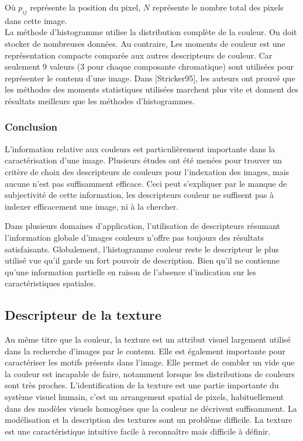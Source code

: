 Où $p_{ij}$ représente la position du pixel, $N$ représente le nombre total des pixels dans cette image.\\


La méthode d'histogramme utilise la distribution complète de la couleur. On doit stocker de nombreuses données. Au contraire, Les moments de couleur est une représentation compacte comparée aux autres descripteurs de couleur. Car seulement 9 valeurs (3 pour chaque composante chromatique) sont utilisées pour représenter le contenu d'une image. Dans [Stricker95], les auteurs ont prouvé que les méthodes des moments statistiques utilisées marchent plus vite et donnent des résultats meilleurs que les méthodes d’histogrammes.\\



\subsubsection{Conclusion}
L'information relative aux couleurs est particulièrement importante dans la caractérisation d’une image. Plusieurs études ont été menées pour trouver un critère de choix des descripteurs de couleurs pour l'indexation des images, mais aucune n'est pas suffisamment efficace. Ceci peut s’expliquer par le manque de subjectivité de cette information, les descripteurs couleur ne suffisent pas à indexer efficacement une image, ni à la chercher.

Dans plusieurs domaines d’application, l’utilisation de descripteurs résumant l’information globale d’images couleurs n’offre pas toujours des résultats satisfaisants. Globalement, l’histogramme couleur reste le descripteur le plus utilisé vue qu'il garde un fort pouvoir de description. Bien qu’il ne contienne qu’une information partielle en raison de l’absence d’indication sur les caractéristiques spatiales.

\subsection{Descripteur de la texture}
Au même titre que la couleur, la texture est un  attribut visuel largement utilisé dans la recherche d’images par le contenu. Elle est également importante pour caractériser les motifs présents dans l’image. Elle permet de combler un vide que la couleur est incapable de faire, notamment lorsque les distributions de couleurs sont très proches. L'identification de la texture est une partie importante du système visuel humain, c'est un arrangement spatial de pixels, habituellement dans des modèles visuels homogènes que la couleur ne décrivent suffisamment. La modélisation et la description des textures sont un problème difficile. La texture est une caractéristique intuitive facile à reconnaître mais difficile à définir.

